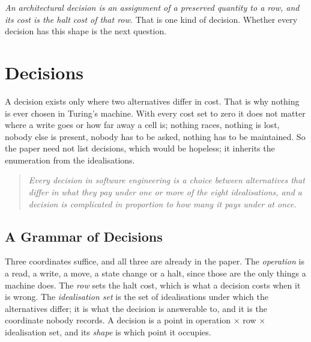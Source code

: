 \documentclass[11pt,oneside]{article}
\theoremstyle{definition}
\theoremstyle{remark}
\begin{document}
\emph{An architectural decision is an assignment of a preserved quantity to a row, and its
cost is the halt cost of that row.} That is one kind of decision. Whether every decision has this shape is the next question.

\section{Decisions}\label{sec:decisions}
A decision exists only where two alternatives differ in cost. That is why nothing is
ever chosen in Turing's machine. With every cost set to zero it does not matter where a
write goes or how far away a cell is; nothing races, nothing is lost, nobody else is
present, nobody has to be asked, nothing has to be maintained. So the paper need not list decisions, which would be
hopeless; it inherits the enumeration from the idealisations.

\begin{quote}
\emph{Every decision in software engineering is a choice between alternatives that differ in
what they pay under one or more of the eight idealisations, and a decision is complicated in
proportion to how many it pays under at once.}
\end{quote}



\subsection{A Grammar of Decisions}

Three coordinates suffice, and all three are already in the paper. The \emph{operation} is
a read, a write, a move, a state change or a halt, since those are the only things a
machine does. The \emph{row} sets the halt cost, which is what a decision costs when it is
wrong. The \emph{idealisation set} is the set of idealisations under which the alternatives
differ; it is what the decision is answerable to, and it is the coordinate nobody records.
A decision is a point in operation $\times$ row $\times$ idealisation set, and its
\emph{shape} is which point it occupies.
\end{document}
